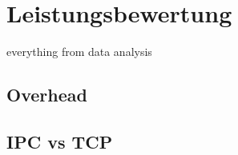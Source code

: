 


\section{Leistungsbewertung}

everything from data analysis

\subsection{Overhead}



\subsection{IPC vs TCP}
